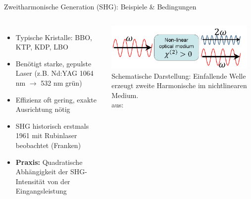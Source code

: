 \documentclass[notes=only]{beamer}
\newcommand{\figciteweburl}[1]{\\[-3mm]{\tiny aus: \citeauthortitleurl{#1}}}
\begin{document}

\begin{frame}{Zweitharmonische Generation (SHG): Beispiele \& Bedingungen}
  \begin{columns}[T,onlytextwidth]
      \begin{itemize}
        \item Typische Kristalle: BBO, KTP, KDP, LBO
        \pause
        \item Benötigt starke, gepulste Laser (z.B. Nd:YAG 1064 nm $\rightarrow$ 532 nm grün)
        \item Effizienz oft gering, exakte Ausrichtung nötig
        \pause
        \item SHG historisch erstmals 1961 mit Rubinlaser beobachtet (Franken)
        \item \textbf{Praxis:} Quadratische Abhängigkeit der SHG-Intensität von der Eingangsleistung
      \end{itemize}
      \includegraphics[width=0.95\textwidth]{Images/Schematic_of_the_SHG_conversion_of_an_excited_wave_in_a_non-linear_medium.png}\\
      {\tiny Schematische Darstellung: Einfallende Welle erzeugt zweite Harmonische im nichtlinearen Medium. \figciteweburl{BPAegirsson2017}}
  \end{columns}
\end{frame}
\end{document}
